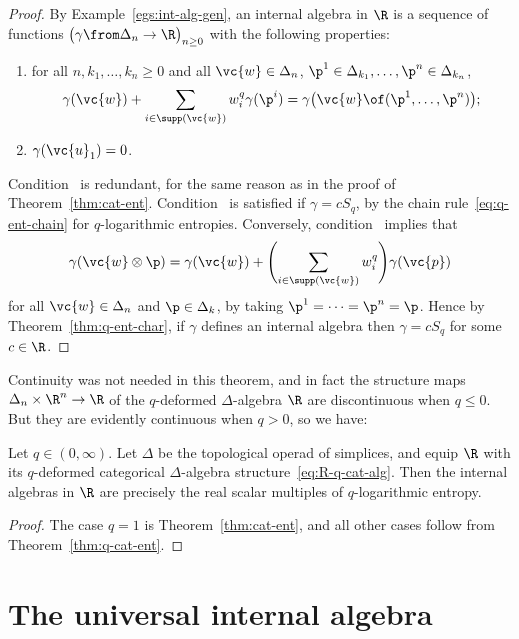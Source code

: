 \begin{proof}
By Example~\ref{egs:int-alg-gen}, an internal
algebra in $\R$ is a sequence of functions $\bigl( \gamma \from \Delta_n
\to \R \bigr)_{n \geq 0}$ with the following properties:
% 
\begin{enumerate}
\item 
{}
for all $n, k_1, \ldots, k_n \geq 0$ and all $\vc{w} \in \Delta_n$, $\p^1
\in \Delta_{k_1}, \ldots, \p^n \in \Delta_{k_n}$,
\[
\gamma(\vc{w}) + \sum_{i \in \supp(\vc{w})} w_i^q \gamma(\p^i)
=
\gamma\bigl(\vc{w} \of (\p^1, \ldots, \p^n)\bigr);
\]

\item
{}
$\gamma(\vc{u}_1) = 0$.
\end{enumerate}
% 
Condition~ is redundant, for the same reason as
in the proof of Theorem~\ref{thm:cat-ent}.
Condition~ is satisfied if $\gamma = cS_q$, by
the chain rule~\eqref{eq:q-ent-chain} for $q$-logarithmic entropies.
Conversely, condition~ implies that
\[
\gamma(\vc{w} \otimes \p) 
= 
\gamma(\vc{w}) + 
\Biggl(\sum_{i \in \supp(\vc{w})} w_i^q\Biggr) \gamma(\vc{p})
\]
for all $\vc{w} \in \Delta_n$ and $\p \in \Delta_k$, by taking $\p^1 =
\cdots = \p^n = \p$.  Hence by Theorem~\ref{thm:q-ent-char}, if $\gamma$
defines an internal algebra then $\gamma = cS_q$ for some $c \in
\R$.
\end{proof}

Continuity was not needed in this theorem, and in fact the structure maps
$\Delta_n \times \R^n \to \R$ of the $q$-deformed $\Delta$-algebra $\R$ are
discontinuous when $q \leq 0$.  But they are evidently continuous when $q >
0$, so we have:

\begin{cor}
Let $q \in (0, \infty)$.  Let $\Delta$ be the topological operad of
simplices, and equip $\R$ with its $q$-deformed categorical
$\Delta$-algebra structure~\eqref{eq:R-q-cat-alg}.  Then the internal
algebras in $\R$ are precisely the real scalar multiples of $q$-logarithmic
entropy. 
\end{cor}

\begin{proof}
The case $q = 1$ is Theorem~\ref{thm:cat-ent}, and all other cases
follow from Theorem~\ref{thm:q-cat-ent}.
\end{proof}


\section{The universal internal algebra}


